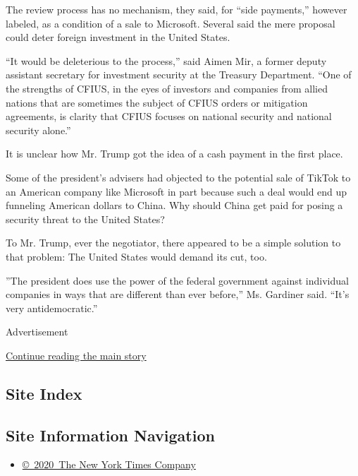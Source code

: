 The review process has no mechanism, they said, for ``side payments,''
however labeled, as a condition of a sale to Microsoft. Several said the
mere proposal could deter foreign investment in the United States.

``It would be deleterious to the process,'' said Aimen Mir, a former
deputy assistant secretary for investment security at the Treasury
Department. ``One of the strengths of CFIUS, in the eyes of investors
and companies from allied nations that are sometimes the subject of
CFIUS orders or mitigation agreements, is clarity that CFIUS focuses on
national security and national security alone.''

It is unclear how Mr. Trump got the idea of a cash payment in the first
place.

Some of the president's advisers had objected to the potential sale of
TikTok to an American company like Microsoft in part because such a deal
would end up funneling American dollars to China. Why should China get
paid for posing a security threat to the United States?

To Mr. Trump, ever the negotiator, there appeared to be a simple
solution to that problem: The United States would demand its cut, too.

''The president does use the power of the federal government against
individual companies in ways that are different than ever before,'' Ms.
Gardiner said. ``It's very antidemocratic.''

Advertisement

\protect\hyperlink{after-bottom}{Continue reading the main story}

\hypertarget{site-index}{%
\subsection{Site Index}\label{site-index}}

\hypertarget{site-information-navigation}{%
\subsection{Site Information
Navigation}\label{site-information-navigation}}

\begin{itemize}
\tightlist
\item
  \href{https://help.nytimes.com/hc/en-us/articles/115014792127-Copyright-notice}{©~2020~The
  New York Times Company}
\end{itemize}

